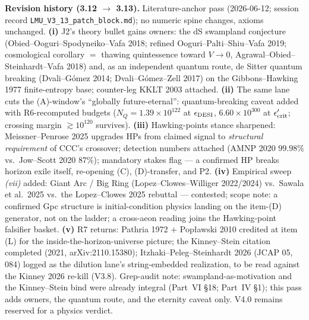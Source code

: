 \documentclass[11pt]{article}
\begin{document}
{\medskip
\noindent\textbf{Revision history (3.12 $\to$ 3.13).} Literature-anchor pass (2026-06-12; session record \texttt{LMU\_V3\_13\_patch\_block.md}); no numeric spine changes, axioms unchanged. \textbf{(i)} J2's theory bullet gains owners: the dS swampland conjecture (Obied--Ooguri--Spodyneiko--Vafa 2018; refined Ooguri--Palti--Shiu--Vafa 2019; cosmological corollary $=$ thawing quintessence toward $V\to0$, Agrawal--Obied--Steinhardt--Vafa 2018) and, as an independent quantum route, de Sitter quantum breaking (Dvali--G\'omez 2014; Dvali--G\'omez--Zell 2017) on the Gibbons--Hawking 1977 finite-entropy base; counter-leg KKLT 2003 attached. \textbf{(ii)} The same lane cuts the (A)-window's ``globally future-eternal'': quantum-breaking caveat added with R6-recomputed budgets ($N_Q=1.39\times10^{122}$ at $\epsilon_{\rm DESI}$, $6.60\times10^{300}$ at $\epsilon'_{\rm crit}$; crossing margin $\gtrsim10^{120}$ survives). \textbf{(iii)} Hawking-points stance sharpened: Meissner--Penrose 2025 upgrades HPs from claimed signal to \emph{structural requirement} of CCC's crossover; detection numbers attached (AMNP 2020 $99.98\%$ vs.\ Jow--Scott 2020 $87\%$); mandatory stakes flag --- a confirmed HP breaks horizon exile itself, re-opening (C), (D)-transfer, and P2. \textbf{(iv)} Empirical sweep \emph{(vii)} added: Giant Arc / Big Ring (Lopez--Clowes--Williger 2022/2024) vs.\ Sawala et al.\ 2025 vs.\ the Lopez--Clowes 2025 rebuttal --- contested; scope note: a confirmed Gpc structure is initial-condition physics landing on the item-(D) generator, not on the ladder; a cross-aeon reading joins the Hawking-point falsifier basket. \textbf{(v)} R7 returns: Pathria 1972 $+$ Pop\l awski 2010 credited at item (L) for the inside-the-horizon-universe picture; the Kinney--Stein citation completed (2021, arXiv:2110.15380); Itzhaki--Peleg--Steinhardt 2026 (JCAP 05, 084) logged as the dilution lane's string-embedded realization, to be read against the Kinney 2026 re-kill (V3.8). Grep-audit note: swampland-as-motivation and the Kinney--Stein bind were already integral (Part~VI \S18; Part~IV \S1); this pass adds owners, the quantum route, and the eternity caveat only. V4.0 remains reserved for a physics verdict.

}
\end{document}
